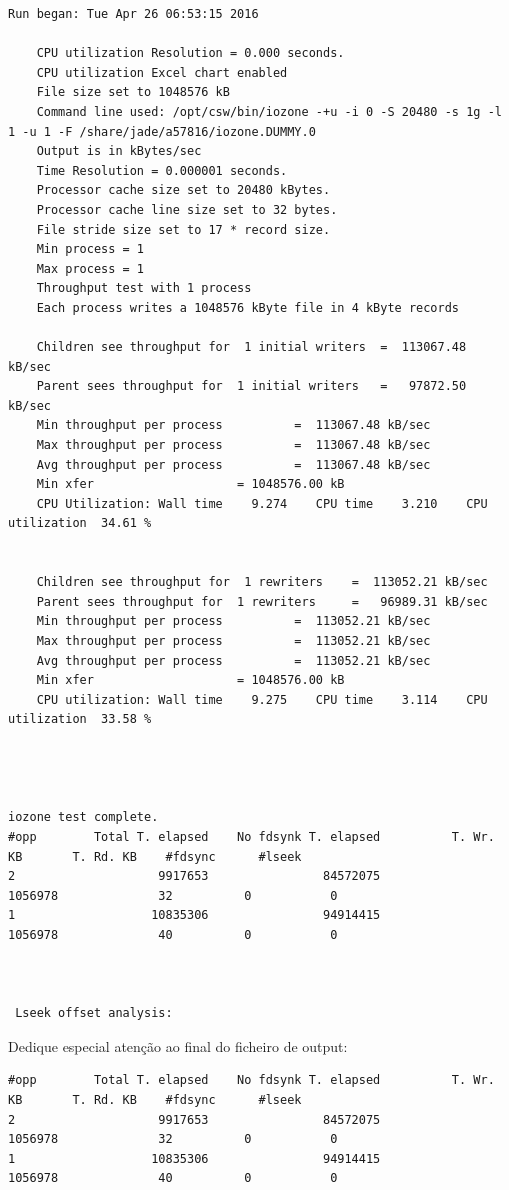 \documentclass[a4paper]{article}
\begin{document}
{\begin{lstlisting}[style=output]
	Run began: Tue Apr 26 06:53:15 2016

	CPU utilization Resolution = 0.000 seconds.
	CPU utilization Excel chart enabled
	File size set to 1048576 kB
	Command line used: /opt/csw/bin/iozone -+u -i 0 -S 20480 -s 1g -l 1 -u 1 -F /share/jade/a57816/iozone.DUMMY.0
	Output is in kBytes/sec
	Time Resolution = 0.000001 seconds.
	Processor cache size set to 20480 kBytes.
	Processor cache line size set to 32 bytes.
	File stride size set to 17 * record size.
	Min process = 1 
	Max process = 1 
	Throughput test with 1 process
	Each process writes a 1048576 kByte file in 4 kByte records

	Children see throughput for  1 initial writers 	=  113067.48 kB/sec
	Parent sees throughput for  1 initial writers 	=   97872.50 kB/sec
	Min throughput per process 			=  113067.48 kB/sec 
	Max throughput per process 			=  113067.48 kB/sec
	Avg throughput per process 			=  113067.48 kB/sec
	Min xfer 					= 1048576.00 kB
	CPU Utilization: Wall time    9.274    CPU time    3.210    CPU utilization  34.61 %


	Children see throughput for  1 rewriters 	=  113052.21 kB/sec
	Parent sees throughput for  1 rewriters 	=   96989.31 kB/sec
	Min throughput per process 			=  113052.21 kB/sec 
	Max throughput per process 			=  113052.21 kB/sec
	Avg throughput per process 			=  113052.21 kB/sec
	Min xfer 					= 1048576.00 kB
	CPU utilization: Wall time    9.275    CPU time    3.114    CPU utilization  33.58 %




iozone test complete.
#opp 	    Total T. elapsed	No fdsynk T. elapsed	      T. Wr. KB	      T. Rd. KB	   #fdsync	    #lseek
2    	             9917653	            84572075	        1056978	             32	         0	         0
1    	            10835306	            94914415	        1056978	             40	         0	         0



 Lseek offset analysis:
\end{lstlisting}

Dedique especial atenção ao final do ficheiro de output:


\begin{lstlisting}[style=command,basicstyle=\scriptsize]
#opp 	    Total T. elapsed	No fdsynk T. elapsed	      T. Wr. KB	      T. Rd. KB	   #fdsync	    #lseek
2    	             9917653	            84572075	        1056978	             32	         0	         0
1    	            10835306	            94914415	        1056978	             40	         0	         0
\end{lstlisting}


}
\end{document}
